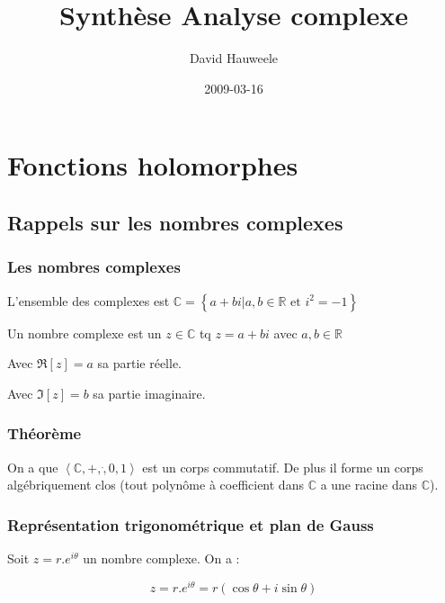 \documentclass[a4paper,10pt]{report}
\author{David Hauweele}
\title{Synthèse Analyse complexe}
\date{2009-03-16}
\newcommand{\R}{\mathbb{R}}
\newcommand{\C}{\mathbb{C}}
\newcommand{\tset}[1]{\left\lbrace #1 \right\rbrace}
\newcommand{\grp}[1]{\left\langle #1 \right\rangle}
\newcommand{\AND}{\mbox{ et }}
\begin{document}
\maketitle




\tableofcontents
\newpage
\chapter{Fonctions holomorphes}

\section{Rappels sur les nombres complexes}

\subsection{Les nombres complexes}

L'ensemble des complexes est $\C = \tset{a + bi \vert a, b \in \R \AND i^2 = -1}$

Un nombre complexe est un $z \in \C$ tq $z = a + bi$ avec $a,b \in \R$

Avec $\Re [z] = a$ sa partie réelle.

Avec $\Im [z] = b$ sa partie imaginaire.

\subsection{Théorème}

On a que $\grp{\C,+,\dot,0,1}$ est un corps commutatif. De plus il forme un corps algébriquement clos (tout polynôme à coefficient dans $\C$ a une racine dans $\C$).

\subsection{Représentation trigonométrique et plan de Gauss}

Soit $z = r.e^{i\theta}$ un nombre complexe. On a :

\[ z = r.e^{i \theta} = r \left( \cos \theta + i \sin \theta \right) \]


%    
\end{document}
